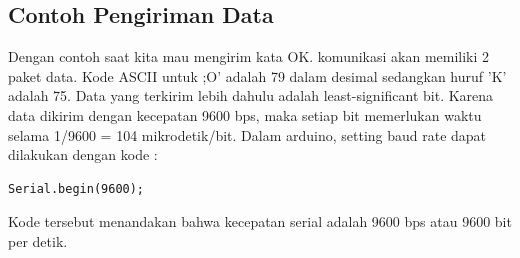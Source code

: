 \subsection{Contoh Pengiriman Data}
Dengan contoh saat kita mau mengirim kata OK. komunikasi akan memiliki 2 paket data. Kode ASCII untuk ;O' adalah 79 dalam desimal sedangkan huruf 'K' adalah 75. Data yang terkirim lebih dahulu adalah least-significant bit. Karena data dikirim dengan kecepatan 9600 bps, maka setiap bit memerlukan waktu selama 1/9600 = 104 mikrodetik/bit. Dalam arduino, setting baud rate dapat dilakukan dengan kode :
\begin{verbatim}
Serial.begin(9600);
\end{verbatim}
Kode tersebut menandakan bahwa kecepatan serial adalah 9600 bps atau 9600 bit per detik.

